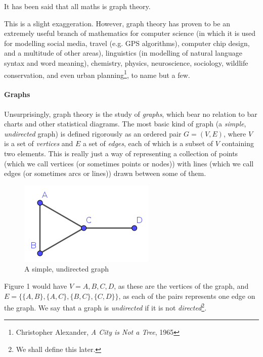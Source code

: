 
It has been said that all maths is graph theory.

This is a slight exaggeration. However, graph theory has proven to be an extremely useful branch of mathematics for computer science (in which it is used for modelling social media, travel (e.g. GPS algorithms), computer chip design, and a multitude of other areas), linguistics (in modelling of natural language syntax and word meaning), chemistry, physics, neuroscience, sociology, wildlife conservation, and even urban planning\footnote{Christopher Alexander, \textit{A City is Not a Tree}, 1965}, to name but a few.

\paragraph{Graphs}

Unsurprisingly, graph theory is the study of \textit{graphs}, which bear no relation to bar charts and other statistical diagrams. The most basic kind of graph (a \textit{simple}, \textit{undirected} graph) is defined rigorously as an ordered pair \(G=(V,E)\), where \(V\) is a set of \textit{vertices} and \(E\) a set of \textit{edges}, each of which is a subset of \(V\) containing two elements. This is really just a way of representing a collection of points (which we call vertices (or sometimes points or nodes)) with lines (which we call edges (or sometimes arcs or lines)) drawn between some of them.



\begin{figure}[h]
\centering
\includegraphics{simplegraph.png}
\caption{A simple, undirected graph}
\label{simplegraph}
\end{figure}



Figure 1 would have \(V={A,B,C,D}\), as these are the vertices of the graph, and \(E=\{\{A,B\},\{A,C\},\{B,C\},\{C,D\}\}\), as each of the pairs represents one edge on the graph. We say that a graph is \textit{undirected} if it is not \textit{directed}\footnote{We shall define this later.}.

